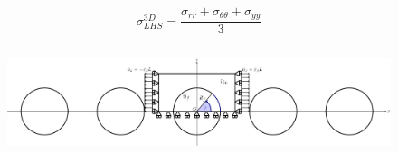 \documentclass[first,firstsupp,lastsupp,last,hyperref,table]{ETHclass}
\begin{document}
\begin{frame}
\begin{columns}[c]
\begin{column}{0.5\textwidth}
\begin{figure}
\end{figure}
\vspace{-0.5cm}
\scriptsize
\begin{equation*}
\sigma^{3D}_{LHS}=\frac{\sigma_{rr}+\sigma_{\theta\theta}+\sigma_{yy}}{3}
\end{equation*}
\end{column}
\end{columns}
\vspace{-0.45cm}
\centering
\begin{figure}
\centering
\includegraphics[width=\textwidth]{refAngle.pdf}
\end{figure}
\end{frame}

\addtocounter{framenumber}{-1}
\end{document}
